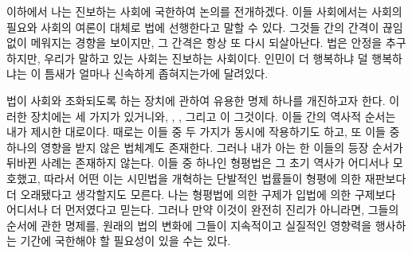 이하에서 나는 진보하는 사회에 국한하여 논의를 전개하겠다.
이들 사회에서는 사회의 필요와 사회의 여론이 대체로 법에 선행한다고
말할 수 있다.
그것들 간의 간격이 끊임없이 메워지는 경향을 보이지만,
그 간격은 항상 또 다시 되살아난다.
법은 안정을 추구하지만, 우리가 말하고 있는 사회는 진보하는 사회이다.
인민이 더 행복하냐 덜 행복하냐는 이 틈새가 얼마나 신속하게 좁혀지는가에
달려있다.

법이 사회와 조화되도록 하는 장치에 관하여 유용한 명제 하나를
개진하고자 한다.
이러한 장치에는 세 가지가 있거니와,
, ,
그리고 이 그것이다.
이들 간의 역사적 순서는 내가 제시한 대로이다.
때로는 이들 중 두 가지가 동시에 작용하기도 하고, 또
이들 중 하나의 영향을 받지 않은 법체계도 존재한다.
그러나 내가 아는 한 이들의 등장 순서가 뒤바뀐 사례는 존재하지 않는다.
이들 중 하나인 형평법은 그 초기 역사가 어디서나 모호했고,
따라서 어떤 이는 시민법을 개혁하는 단발적인 법률들이 형평에 의한 재판보다
더 오래됐다고 생각할지도 모른다.
나는 형평법에 의한 구제가 입법에 의한 구제보다 어디서나 더 먼저였다고 믿는다.
그러나 만약 이것이 완전히 진리가 아니라면,
그들의 순서에 관한 명제를,
원래의 법의 변화에 그들이 지속적이고 실질적인
영향력을 행사하는 기간에
국한해야 할 필요성이 있을 수는 있다.

